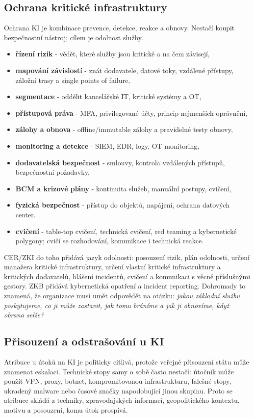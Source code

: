 \documentclass[11pt,a4paper]{article}
\begin{document}
\subsection*{Ochrana kritické infrastruktury}
Ochrana KI je kombinace prevence, detekce, reakce a obnovy. Nestačí koupit bezpečnostní nástroj; cílem je odolnost služby.
\begin{itemize}
  \item \textbf{řízení rizik} - vědět, které služby jsou kritické a na čem závisejí,
  \item \textbf{mapování závislostí} - znát dodavatele, datové toky, vzdálené přístupy, záložní trasy a single points of failure,
  \item \textbf{segmentace} - oddělit kancelářské IT, kritické systémy a OT,
  \item \textbf{přístupová práva} - MFA, privilegované účty, princip nejmenších oprávnění,
  \item \textbf{zálohy a obnova} - offline/immutable zálohy a pravidelné testy obnovy,
  \item \textbf{monitoring a detekce} - SIEM, EDR, logy, OT monitoring,
  \item \textbf{dodavatelská bezpečnost} - smlouvy, kontrola vzdálených přístupů, bezpečnostní požadavky,
  \item \textbf{BCM a krizové plány} - kontinuita služeb, manuální postupy, cvičení,
  \item \textbf{fyzická bezpečnost} - přístup do objektů, napájení, ochrana datových center.
  \item \textbf{cvičení} - table-top cvičení, technická cvičení, red teaming a kybernetické polygony; cvičí se rozhodování, komunikace i technická reakce.
\end{itemize}

CER/ZKI do toho přidává jazyk odolnosti: posouzení rizik, plán odolnosti, určení manažera kritické infrastruktury, určení vlastní kritické infrastruktury a kritických dodavatelů, hlášení incidentů, cvičení a komunikaci s věcně příslušnými gestory. ZKB přidává kybernetická opatření a incident reporting. Dohromady to znamená, že organizace musí umět odpovědět na otázku: \emph{jakou základní službu poskytujeme, co ji může zastavit, jak tomu bráníme a jak ji obnovíme, když obrana selže?}

\subsection*{Přisouzení a odstrašování u KI}
Atribuce u útoků na KI je politicky citlivá, protože veřejné přisouzení státu může znamenat eskalaci. Technické stopy samy o sobě často nestačí: útočník může použít VPN, proxy, botnet, kompromitovanou infrastrukturu, falešné stopy, ukradený malware nebo časové značky napodobující jinou skupinu. Proto se atribuce skládá z techniky, zpravodajských informací, geopolitického kontextu, motivu a posouzení, komu útok prospívá.
\end{document}
